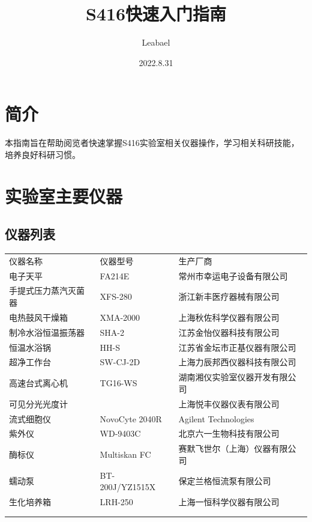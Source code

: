 \documentclass[
]{book}
\title{S416快速入门指南}
\author{Leabael}
\date{2022.8.31}
\begin{document}
\frontmatter
\maketitle

\mainmatter
\hypertarget{ux7b80ux4ecb}{%
\chapter{简介}\label{ux7b80ux4ecb}}

本指南旨在帮助阅览者快速掌握S416实验室相关仪器操作，学习相关科研技能，培养良好科研习惯。

\hypertarget{instrument}{%
\chapter{实验室主要仪器}\label{instrument}}

\hypertarget{ux4eeaux5668ux5217ux8868}{%
\section{仪器列表}\label{ux4eeaux5668ux5217ux8868}}

\begin{longtable}[]{@{}
  >{\raggedright\arraybackslash}p{}
  >{\raggedright\arraybackslash}p{}
  >{\raggedright\arraybackslash}p{}@{}}
\toprule()
\endhead
仪器名称 & 仪器型号 & 生产厂商 \\
电子天平 & FA214E & 常州市幸运电子设备有限公司 \\
手提式压力蒸汽灭菌器 & XFS-280 & 浙江新丰医疗器械有限公司 \\
电热鼓风干燥箱 & XMA-2000 & 上海秋佐科学仪器有限公司 \\
制冷水浴恒温振荡器 & SHA-2 & 江苏金怡仪器科技有限公司 \\
恒温水浴锅 & HH-S & 江苏省金坛市正基仪器有限公司 \\
超净工作台 & SW-CJ-2D & 上海力辰邦西仪器科技有限公司 \\
高速台式离心机 & TG16-WS & 湖南湘仪实验室仪器开发有限公司 \\
可见分光光度计 & 721 & 上海悦丰仪器仪表有限公司 \\
流式细胞仪 & NovoCyte 2040R & Agilent Technologies \\
紫外仪 & WD-9403C & 北京六一生物科技有限公司 \\
酶标仪 & Multiskan FC & 赛默飞世尔（上海）仪器有限公司 \\
蠕动泵 & BT-200J/YZ1515X & 保定兰格恒流泵有限公司 \\
生化培养箱 & LRH-250 & 上海一恒科学仪器有限公司 \\
& & \\
& & \\
\bottomrule()
\end{longtable}
\end{document}
